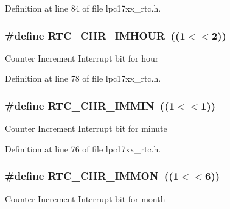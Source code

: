 \-Definition at line 84 of file lpc17xx\-\_\-rtc.\-h.

\hypertarget{group___r_t_c___private___macros_ga9691dd6beea1cafb0b8731c3eef10e2f}{
\subsubsection[{\-R\-T\-C\-\_\-\-C\-I\-I\-R\-\_\-\-I\-M\-H\-O\-U\-R}]{\setlength{\rightskip}{0pt plus 5cm}\#define {\bf \-R\-T\-C\-\_\-\-C\-I\-I\-R\-\_\-\-I\-M\-H\-O\-U\-R}~((1$<$$<$2))}}\label{group___r_t_c___private___macros_ga9691dd6beea1cafb0b8731c3eef10e2f}
\-Counter \-Increment \-Interrupt bit for hour 

\-Definition at line 78 of file lpc17xx\-\_\-rtc.\-h.

\hypertarget{group___r_t_c___private___macros_gaa4c8b779d5bb327cde276ae30b5d2f32}{
\subsubsection[{\-R\-T\-C\-\_\-\-C\-I\-I\-R\-\_\-\-I\-M\-M\-I\-N}]{\setlength{\rightskip}{0pt plus 5cm}\#define {\bf \-R\-T\-C\-\_\-\-C\-I\-I\-R\-\_\-\-I\-M\-M\-I\-N}~((1$<$$<$1))}}\label{group___r_t_c___private___macros_gaa4c8b779d5bb327cde276ae30b5d2f32}
\-Counter \-Increment \-Interrupt bit for minute 

\-Definition at line 76 of file lpc17xx\-\_\-rtc.\-h.

\hypertarget{group___r_t_c___private___macros_gad77a58f03fe563e76ebb88a7e662f814}{
\subsubsection[{\-R\-T\-C\-\_\-\-C\-I\-I\-R\-\_\-\-I\-M\-M\-O\-N}]{\setlength{\rightskip}{0pt plus 5cm}\#define {\bf \-R\-T\-C\-\_\-\-C\-I\-I\-R\-\_\-\-I\-M\-M\-O\-N}~((1$<$$<$6))}}\label{group___r_t_c___private___macros_gad77a58f03fe563e76ebb88a7e662f814}
\-Counter \-Increment \-Interrupt bit for month 

